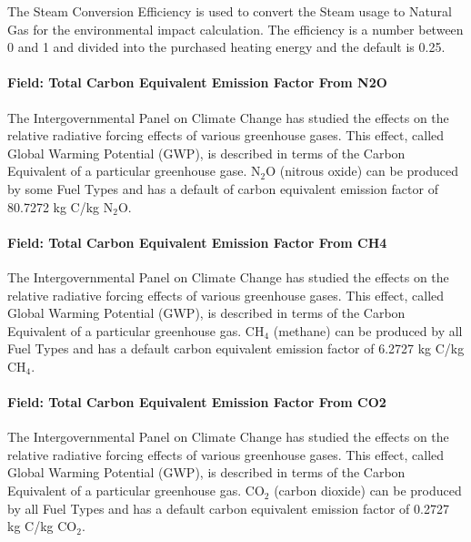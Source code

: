 The Steam Conversion Efficiency is used to convert the Steam usage to Natural Gas for the environmental impact calculation. The efficiency is a number between 0 and 1 and divided into the purchased heating energy and the default is 0.25.

\paragraph{Field: Total Carbon Equivalent Emission Factor From N2O}\label{field-total-carbon-equivalent-emission-factor-from-n2o}

The Intergovernmental Panel on Climate Change has studied the effects on the relative radiative forcing effects of various greenhouse gases. This effect, called Global Warming Potential (GWP), is described in terms of the Carbon Equivalent of a particular greenhouse gase. N\(_{2}\)O (nitrous oxide) can be produced by some Fuel Types and has a default of carbon equivalent emission factor of 80.7272 kg C/kg N\(_{2}\)O.

\paragraph{Field: Total Carbon Equivalent Emission Factor From CH4}\label{field-total-carbon-equivalent-emission-factor-from-ch4}

The Intergovernmental Panel on Climate Change has studied the effects on the relative radiative forcing effects of various greenhouse gases. This effect, called Global Warming Potential (GWP), is described in terms of the Carbon Equivalent of a particular greenhouse gas. CH\(_{4}\) (methane) can be produced by all Fuel Types and has a default carbon equivalent emission factor of 6.2727 kg C/kg CH\(_{4}\).

\paragraph{Field: Total Carbon Equivalent Emission Factor From CO2}\label{field-total-carbon-equivalent-emission-factor-from-co2}

The Intergovernmental Panel on Climate Change has studied the effects on the relative radiative forcing effects of various greenhouse gases. This effect, called Global Warming Potential (GWP), is described in terms of the Carbon Equivalent of a particular greenhouse gas. CO\(_{2}\) (carbon dioxide) can be produced by all Fuel Types and has a default carbon equivalent emission factor of 0.2727 kg C/kg CO\(_{2}\).

